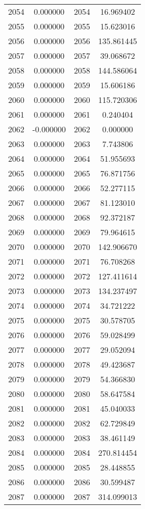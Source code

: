 \documentclass[12pt]{article}
\begin{document}
\begin{longtable}{@{}cccc@{}}
2054 & 0.000000 & 2054 & 16.969402 \\
2055 & 0.000000 & 2055 & 15.623016 \\
2056 & 0.000000 & 2056 & 135.861445 \\
2057 & 0.000000 & 2057 & 39.068672 \\
2058 & 0.000000 & 2058 & 144.586064 \\
2059 & 0.000000 & 2059 & 15.606186 \\
2060 & 0.000000 & 2060 & 115.720306 \\
2061 & 0.000000 & 2061 & 0.240404 \\
2062 & -0.000000 & 2062 & 0.000000 \\
2063 & 0.000000 & 2063 & 7.743806 \\
2064 & 0.000000 & 2064 & 51.955693 \\
2065 & 0.000000 & 2065 & 76.871756 \\
2066 & 0.000000 & 2066 & 52.277115 \\
2067 & 0.000000 & 2067 & 81.123010 \\
2068 & 0.000000 & 2068 & 92.372187 \\
2069 & 0.000000 & 2069 & 79.964615 \\
2070 & 0.000000 & 2070 & 142.906670 \\
2071 & 0.000000 & 2071 & 76.708268 \\
2072 & 0.000000 & 2072 & 127.411614 \\
2073 & 0.000000 & 2073 & 134.237497 \\
2074 & 0.000000 & 2074 & 34.721222 \\
2075 & 0.000000 & 2075 & 30.578705 \\
2076 & 0.000000 & 2076 & 59.028499 \\
2077 & 0.000000 & 2077 & 29.052094 \\
2078 & 0.000000 & 2078 & 49.423687 \\
2079 & 0.000000 & 2079 & 54.366830 \\
2080 & 0.000000 & 2080 & 58.647584 \\
2081 & 0.000000 & 2081 & 45.040033 \\
2082 & 0.000000 & 2082 & 62.729849 \\
2083 & 0.000000 & 2083 & 38.461149 \\
2084 & 0.000000 & 2084 & 270.814454 \\
2085 & 0.000000 & 2085 & 28.448855 \\
2086 & 0.000000 & 2086 & 30.599487 \\
2087 & 0.000000 & 2087 & 314.099013 \\

\end{longtable}
\end{document}
